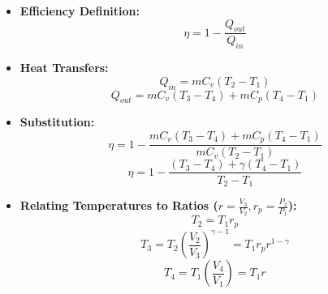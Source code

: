 \begin{itemize}
    \item \textbf{Efficiency Definition:}
    \[ \eta = 1 - \frac{Q_{out}}{Q_{in}} \]

    \item \textbf{Heat Transfers:}
    \[ Q_{in} = m C_v (T_2 - T_1) \]
    \[ Q_{out} = m C_v (T_3 - T_4) + m C_p (T_4 - T_1) \]

    \item \textbf{Substitution:}
    \[ \eta = 1 - \frac{m C_v (T_3 - T_4) + m C_p (T_4 - T_1)}{m C_v (T_2 - T_1)} \]
    \[ \eta = 1 - \frac{(T_3 - T_4) + \gamma(T_4 - T_1)}{T_2 - T_1} \]

    \item \textbf{Relating Temperatures to Ratios ($r = \frac{V_3}{V_2}, r_p = \frac{P_2}{P_1}$):}
    \[ T_2 = T_1 r_p \]
    \[ T_3 = T_2 \left(\frac{V_2}{V_3}\right)^{\gamma-1} = T_1 r_p r^{1-\gamma} \]
    \[ T_4 = T_1 \left(\frac{V_4}{V_1}\right) = T_1 r \]
\end{itemize}

